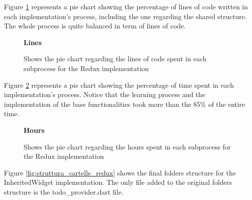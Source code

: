 Figure \ref{image:redux_lines_piechart} represents a pie chart showing the percentage of lines of code written in each implementation's process, including the one regarding the shared structure. The whole process is quite balanced in term of lines of code.
\begin{figure}[H]

\caption*{\textbf{Lines}}
\centering
{}
 \caption{Shows the pie chart regarding the lines of code spent in each subprocess for the Redux implementation}
 \label{image:redux_lines_piechart}

\end{figure}
Figure \ref{image:redux_hours_piechart} represents a pie chart showing the percentage of time spent in each implementation's process. Notice that the learning process and the implementation of the base functionalities took more than the 85\% of the entire time.
\begin{figure}[H]
 \caption*{\textbf{Hours}}
\centering
{}
 \caption{Shows the pie chart regarding the hours spent in each subprocess for the Redux implementation}
 \label{image:redux_hours_piechart}

\end{figure}
Figure \ref{fig:struttura_cartelle_redux} shows the final folders structure for the InheritedWidget implementation. The only  file added to the original folders structure is the todo\_provider.dart file.
